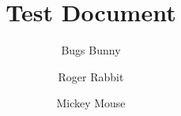 \documentclass{article}
\begin{document}
\title{Test Document}

\author[a]{Bugs Bunny}
\author[a]{Roger Rabbit}
\author[b]{Mickey Mouse}

\begin{abstract}
\blindtext
\end{abstract}

\maketitle

\blinddocument
\end{document}
